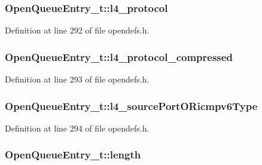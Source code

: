 \subsubsection[{\texorpdfstring{l4\+\_\+protocol}{l4_protocol}}]{ Open\+Queue\+Entry\+\_\+t\+::l4\+\_\+protocol}\hypertarget{struct_open_queue_entry__t_adbf27c6999f985512356b1f5732ffd98}{}\label{struct_open_queue_entry__t_adbf27c6999f985512356b1f5732ffd98}


Definition at line 292 of file opendefs.\+h.

\subsubsection[{\texorpdfstring{l4\+\_\+protocol\+\_\+compressed}{l4_protocol_compressed}}]{ Open\+Queue\+Entry\+\_\+t\+::l4\+\_\+protocol\+\_\+compressed}\hypertarget{struct_open_queue_entry__t_a001217b60ab067859b164520a37f0250}{}\label{struct_open_queue_entry__t_a001217b60ab067859b164520a37f0250}


Definition at line 293 of file opendefs.\+h.

\subsubsection[{\texorpdfstring{l4\+\_\+source\+Port\+O\+Ricmpv6\+Type}{l4_sourcePortORicmpv6Type}}]{ Open\+Queue\+Entry\+\_\+t\+::l4\+\_\+source\+Port\+O\+Ricmpv6\+Type}\hypertarget{struct_open_queue_entry__t_a30e8edde6091680fb6c03fdb5f27d92f}{}\label{struct_open_queue_entry__t_a30e8edde6091680fb6c03fdb5f27d92f}


Definition at line 294 of file opendefs.\+h.

\subsubsection[{\texorpdfstring{length}{length}}]{ Open\+Queue\+Entry\+\_\+t\+::length}\hypertarget{struct_open_queue_entry__t_aa3cf5004f2ac9ef3a888f42e726a5cce}{}\label{struct_open_queue_entry__t_aa3cf5004f2ac9ef3a888f42e726a5cce}


